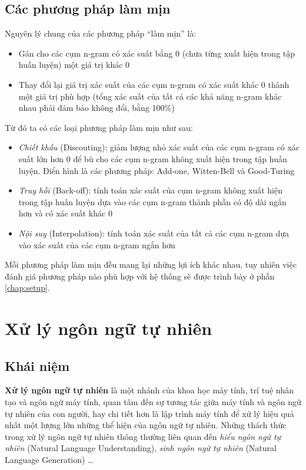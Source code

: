 \documentclass[12pt]{report}
\begin{document}
\subsection{Các phương pháp làm mịn}

Nguyên lý chung của các phương pháp ``làm mịn'' là:

\begin{itemize}
	\item Gán cho các cụm n-gram có xác suất bằng 0 (chưa từng xuất hiện trong tập huấn luyện) một giá trị khác 0
	\item Thay đổi lại giá trị xác suất của các cụm n-gram có xác suất khác 0 thành một giá trị phù hợp (tổng xác suất của tất cả các khả năng n-gram khác nhau phải đảm bảo không đổi, bằng 100\%)
\end{itemize}

\noindent Từ đó ta có các loại phương pháp làm mịn như sau:

\begin{itemize}
	\item \textit{Chiết khấu} (Discouting): giảm lượng nhỏ xác suất của các cụm n-gram có xác suất lớn hơn 0 để bù cho các cụm n-gram không xuất hiện trong tập huấn luyện. Điển hình là các phương pháp: Add-one, Witten-Bell và Good-Turing
	\item \textit{Truy hồi} (Back-off): tính toán xác suất của cụm n-gram không xuất hiện trong tập huấn luyện dựa vào các cụm n-gram thành phần có độ dài ngắn hơn và có xác suất khác 0
	\item \textit{Nội suy} (Interpolation): tính toán xác suất của tất cả các cụm n-gram dựa vào xác suất của các cụm n-gram ngắn hơn
\end{itemize}

Mỗi phương pháp làm mịn đều mang lại những lợi ích khác nhau, tuy nhiên việc đánh giá phương pháp nào phù hợp với hệ thống sẽ được trình bày ở phần \ref{chap:setup}.

\section{Xử lý ngôn ngữ tự nhiên}

\subsection{Khái niệm}

\textbf{Xử lý ngôn ngữ tự nhiên} là một nhánh của khoa học máy tính, trí tuệ nhân tạo và ngôn ngữ máy tính, quan tâm đến sự tương tác giữa máy tính và ngôn ngữ tự nhiên của con người, hay chi tiết hơn là lập trình máy tính để xử lý hiệu quả nhất một lượng lớn những thể hiện của ngôn ngữ tự nhiên. Những thách thức trong xử lý ngôn ngữ tự nhiên thông thường liên quan đến \textit{hiểu ngôn ngữ tự nhiên} (Natural Language Understanding), \textit{sinh ngôn ngữ tự nhiên} (Natural Language Generation) \ldots
\end{document}
